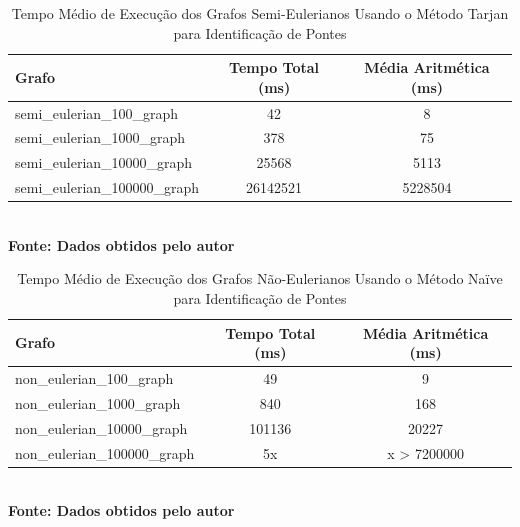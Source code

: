 \begin{table}[htb]
	\centering
	\caption{\hspace{0.1cm} Tempo Médio de Execução dos Grafos Semi-Eulerianos Usando o Método Tarjan para Identificação de Pontes}
	\vspace{-0.3cm} %
	\label{tab:tempo_execucao_semi_eulerianos_tarjan}
	\begin{tabular}{l|c|c}
    \hline
    \textbf{Grafo} & \textbf{Tempo Total (ms)} & \textbf{Média Aritmética (ms)} \\
    \hline
     semi\_eulerian\_100\_graph & 42 & 8 \\
     semi\_eulerian\_1000\_graph & 378 & 75 \\
     semi\_eulerian\_10000\_graph & 25568 & 5113 \\
     semi\_eulerian\_100000\_graph & 26142521 & 5228504 \\
    \hline
 \end{tabular}
 	\vspace{.1cm}  %
	\small
	{\footnotesize\\ \textbf{Fonte: Dados obtidos pelo autor}}
\end{table}

\begin{table}[htb]
	\centering
	\caption{\hspace{0.1cm} Tempo Médio de Execução dos Grafos Não-Eulerianos Usando o Método Naïve para Identificação de Pontes}
	\vspace{-0.3cm} %
	\label{tab:tempo_execucao_nao_eulerianos_naive}
	\begin{tabular}{l|c|c}
    \hline
    \textbf{Grafo} & \textbf{Tempo Total (ms)} & \textbf{Média Aritmética (ms)} \\
    \hline
     non\_eulerian\_100\_graph & 49 & 9 \\
     non\_eulerian\_1000\_graph & 840 & 168 \\
     non\_eulerian\_10000\_graph & 101136 & 20227 \\
     non\_eulerian\_100000\_graph & 5x & x > 7200000 \\
    \hline
 \end{tabular}
 	\vspace{.1cm}  %
	\small
	{\footnotesize\\ \textbf{Fonte: Dados obtidos pelo autor}}
\end{table}


